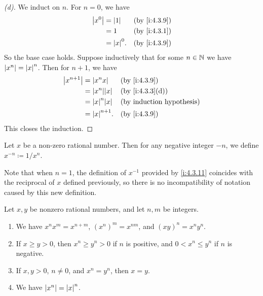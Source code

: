 \begin{proof}[(d)]
  We induct on \(n\).
  For \(n = 0\), we have
  \begin{align*}
    \abs{x^0} & = \abs{1}    &  & \by{i:4.3.9} \\
              & = 1          &  & \by{i:4.3.1} \\
              & = \abs{x}^0. &  & \by{i:4.3.9}
  \end{align*}
  So the base case holds.
  Suppose inductively that for some \(n \in \mathbb{N}\) we have \(\left\lvert x^n\right\rvert = \left\lvert x\right\rvert^n\).
  Then for \(n + 1\), we have
  \begin{align*}
    \abs{x^{n + 1}} & = \abs{x^n x}       &  & \by{i:4.3.9}    \\
                    & = \abs{x^n} \abs{x} &  & \by{i:4.3.3}[d] \\
                    & = \abs{x}^n \abs{x} &  & \byIH           \\
                    & = \abs{x}^{n + 1}.  &  & \by{i:4.3.9}
  \end{align*}
  This closes the induction.
\end{proof}

\begin{defn}\label{i:4.3.11}
  Let \(x\) be a non-zero rational number.
  Then for any negative integer \(-n\), we define \(x^{-n} \coloneqq 1 / x^n\).

  Note that when \(n = 1\), the definition of \(x^{-1}\) provided by \cref{i:4.3.11} coincides with the reciprocal of \(x\) defined previously, so there is no incompatibility of notation caused by this new definition.
\end{defn}

\begin{prop}\label{i:4.3.12}
  Let \(x, y\) be nonzero rational numbers, and let \(n, m\) be integers.
  \begin{enumerate}
    \item We have \(x^n x^m = x^{n + m}\), \((x^n)^m = x^{nm}\), and \((xy)^n = x^n y^n\).
    \item If \(x \geq y > 0\), then \(x^n \geq y^n > 0\) if \(n\) is positive, and \(0 < x^n \leq y^n\) if \(n\) is negative.
    \item If \(x, y > 0\), \(n \neq 0\), and \(x^n = y^n\), then \(x = y\).
    \item We have \(\left\lvert x^n\right\rvert = \left\lvert x\right\rvert^n\).
  \end{enumerate}
\end{prop}

